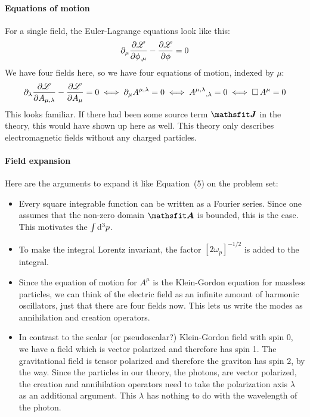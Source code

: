 \documentclass[11pt, english, fleqn, DIV=15, headinclude, BCOR=1cm]{scrartcl}
\begin{document}
\paragraph{Equations of motion}

For a single field, the Euler-Lagrange equations look like this:
\[
    \partial_\mu \frac{\partial {\mathscr L}}{\partial {\phi_{,\mu}}} - \frac{\partial {\mathscr L}}{\partial {\phi}} = 0
\]
We have four fields here, so we have four equations of motion, indexed by
$\mu$:
\[
    \partial_\lambda \frac{\partial {\mathscr L}}{\partial {A_{\mu,\lambda}}} - \frac{\partial {\mathscr L}}{\partial {A_\mu}}
    = 0
    \iff
    \partial_\mu A^{\mu,\lambda} = 0
    \iff
    A^{\mu,\lambda}{}_{,\lambda} = 0
    \iff
    \operatorname{\Box} A^\mu = 0
\]
This looks familiar. If there had been some source term $\tens J$ in the
theory, this would have shown up here as well. This theory only describes
electromagnetic fields without any charged particles.

\paragraph{Field expansion}

Here are the arguments to expand it like Equation~(5) on the problem set:

\begin{itemize}
    \item
        Every square integrable function can be written as a Fourier series.
        Since one assumes that the non-zero domain $\tens A$ is bounded, this
        is the case. This motivates the $\int \mathop{}\!\mathrm d^3 p$.

    \item
        To make the integral Lorentz invariant, the factor $[2
        \omega_p]^{-1/2}$ is added to the integral.

    \item
        Since the equation of motion for $A^\mu$ is the Klein-Gordon equation
        for massless particles, we can think of the electric field as an
        infinite amount of harmonic oscillators, just that there are four
        fields now. This lets us write the modes as annihilation and creation
        operators.

    \item
        In contrast to the scalar (or pseudoscalar?) Klein-Gordon field with
        spin 0, we have a field which is vector polarized and therefore has
        spin 1. The gravitational field is tensor polarized and therefore the
        graviton has spin 2, by the way. Since the particles in our theory, the
        photons, are vector polarized, the creation and annihilation operators
        need to take the polarization axis $\lambda$ as an additional argument.
        This $\lambda$ has nothing to do with the wavelength of the photon.
\end{itemize}
\end{document}

